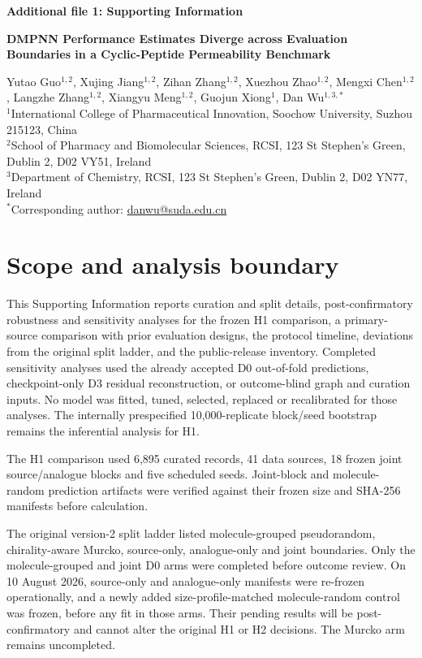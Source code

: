 \documentclass[10pt]{article}
\begin{document}
\begin{center}
{\Large\bfseries Additional file 1: Supporting Information\par}
\vspace{0.6em}
{\large\bfseries DMPNN Performance Estimates Diverge across Evaluation Boundaries in a Cyclic-Peptide Permeability Benchmark\par}
\vspace{0.8em}
Yutao Guo$^{1,2}$, Xujing Jiang$^{1,2}$, Zihan Zhang$^{1,2}$, Xuezhou Zhao$^{1,2}$, Mengxi Chen$^{1,2}$, Langzhe Zhang$^{1,2}$, Xiangyu Meng$^{1,2}$, Guojun Xiong$^{1}$, Dan Wu$^{1,3,*}$\\
\vspace{0.35em}
\small $^{1}$International College of Pharmaceutical Innovation, Soochow University, Suzhou 215123, China\\
$^{2}$School of Pharmacy and Biomolecular Sciences, RCSI, 123 St Stephen's Green, Dublin 2, D02 VY51, Ireland\\
$^{3}$Department of Chemistry, RCSI, 123 St Stephen's Green, Dublin 2, D02 YN77, Ireland\\
$^{*}$Corresponding author: \href{mailto:danwu@suda.edu.cn}{danwu@suda.edu.cn}
\end{center}

\section*{Scope and analysis boundary}

This Supporting Information reports curation and split details, post-confirmatory robustness and sensitivity analyses for the frozen H1 comparison, a primary-source comparison with prior evaluation designs, the protocol timeline, deviations from the original split ladder, and the public-release inventory. Completed sensitivity analyses used the already accepted D0 out-of-fold predictions, checkpoint-only D3 residual reconstruction, or outcome-blind graph and curation inputs. No model was fitted, tuned, selected, replaced or recalibrated for those analyses. The internally prespecified 10,000-replicate block/seed bootstrap remains the inferential analysis for H1.

The H1 comparison used 6,895 curated records, 41 data sources, 18 frozen joint source/analogue blocks and five scheduled seeds. Joint-block and molecule-random prediction artifacts were verified against their frozen size and SHA-256 manifests before calculation.

The original version-2 split ladder listed molecule-grouped pseudorandom, chirality-aware Murcko, source-only, analogue-only and joint boundaries. Only the molecule-grouped and joint D0 arms were completed before outcome review. On 10 August 2026, source-only and analogue-only manifests were re-frozen operationally, and a newly added size-profile-matched molecule-random control was frozen, before any fit in those arms. Their pending results will be post-confirmatory and cannot alter the original H1 or H2 decisions. The Murcko arm remains uncompleted.
\end{document}
